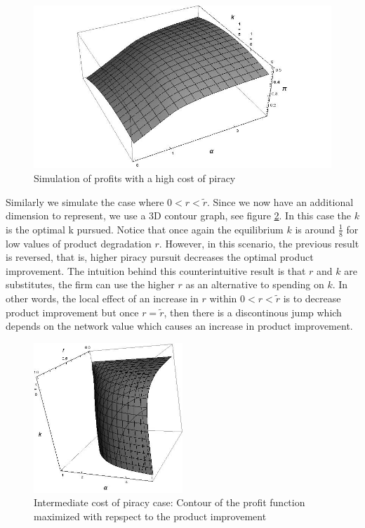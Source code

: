 \documentclass[12pt]{report}
\newcommand{\flabel}[1]{\label{fig:#1}}
\numberwithin{equation}{section}
\begin{document}
\begin{figure}[h!] 
\centering
\includegraphics[width=1.0\textwidth]{./figures/Endogenousksimulation0.jpg}
\caption{Simulation of profits with a high cost of piracy }
\flabel{Classic case: Buyers and non-users, }
\label{endk1}
\end{figure}

Similarly we simulate the case where $0<r<\tilde{r}$. Since we now have an additional dimension to represent, we use a 3D contour graph, see figure \ref{endk2}. In this case the $k$ is the optimal k pursued. Notice that once again the equilibrium $k$ is around $\frac{1}{8}$ for low values of product degradation $r$. However, in this scenario, the previous result is reversed, that is, higher piracy pursuit decreases the optimal product improvement. The intuition behind this counterintuitive result is that $r$ and $k$ are substitutes, the firm can use the higher $r$ as an alternative to spending on $k$. In other words, the local effect of an increase in $r$ within $0<r<\tilde{r}$ is to decrease product improvement but once $r=\tilde{r}$, then there is a discontinous jump which depends on the network value which causes an increase in product improvement. 


\begin{figure}[t!] 
\centering
\includegraphics[width=0.5\textwidth]{./figures/Endogenousksimulation.jpg}
\caption{Intermediate cost of piracy case: Contour of the profit function maximized with repspect to the product improvement}
\flabel{Buyers, pirates and non-users}
\label{endk2}
\end{figure}
\end{document}
